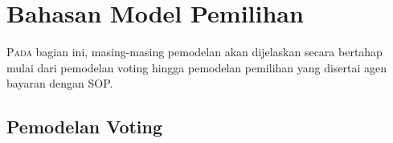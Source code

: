 \section{Bahasan Model Pemilihan}

\lettrine[nindent=-0.01em,findent=0.2em]{P}{ada} bagian ini, masing-masing pemodelan akan dijelaskan secara bertahap mulai dari pemodelan voting hingga pemodelan pemilihan yang disertai agen bayaran dengan SOP.

\subsection{Pemodelan Voting}


